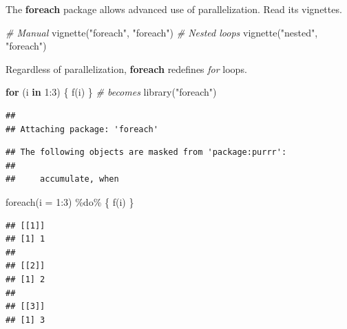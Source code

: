 \documentclass[
  12pt,
  american,
  a4paper,
  extrafontsizes,onecolumn,openright
  ]{memoir}
\newenvironment{Shaded}{\begin{snugshade}}{\end{snugshade}}
\newcommand{\AttributeTok}[1]{\textcolor[rgb]{0.77,0.63,0.00}{#1}}
\newcommand{\CommentTok}[1]{\textcolor[rgb]{0.56,0.35,0.01}{\textit{#1}}}
\newcommand{\ControlFlowTok}[1]{\textcolor[rgb]{0.13,0.29,0.53}{\textbf{#1}}}
\newcommand{\DecValTok}[1]{\textcolor[rgb]{0.00,0.00,0.81}{#1}}
\newcommand{\FunctionTok}[1]{\textcolor[rgb]{0.00,0.00,0.00}{#1}}
\newcommand{\NormalTok}[1]{#1}
\newcommand{\SpecialCharTok}[1]{\textcolor[rgb]{0.00,0.00,0.00}{#1}}
\newcommand{\StringTok}[1]{\textcolor[rgb]{0.31,0.60,0.02}{#1}}
\begin{document}
The \textbf{foreach} package allows advanced use of parallelization.
Read its vignettes.

\scriptsize

\begin{Shaded}
\begin{Highlighting}[]
\CommentTok{\# Manual}
\FunctionTok{vignette}\NormalTok{(}\StringTok{"foreach"}\NormalTok{, }\StringTok{"foreach"}\NormalTok{)}
\CommentTok{\# Nested loops}
\FunctionTok{vignette}\NormalTok{(}\StringTok{"nested"}\NormalTok{, }\StringTok{"foreach"}\NormalTok{)}
\end{Highlighting}
\end{Shaded}

\normalsize

Regardless of parallelization, \textbf{foreach} redefines \emph{for} loops.

\scriptsize

\begin{Shaded}
\begin{Highlighting}[]
\ControlFlowTok{for}\NormalTok{ (i }\ControlFlowTok{in} \DecValTok{1}\SpecialCharTok{:}\DecValTok{3}\NormalTok{) \{}
    \FunctionTok{f}\NormalTok{(i)}
\NormalTok{\}}
\CommentTok{\# becomes}
\FunctionTok{library}\NormalTok{(}\StringTok{"foreach"}\NormalTok{)}
\end{Highlighting}
\end{Shaded}

\begin{verbatim}
## 
## Attaching package: 'foreach'
\end{verbatim}

\begin{verbatim}
## The following objects are masked from 'package:purrr':
## 
##     accumulate, when
\end{verbatim}

\begin{Shaded}
\begin{Highlighting}[]
\FunctionTok{foreach}\NormalTok{(}\AttributeTok{i =} \DecValTok{1}\SpecialCharTok{:}\DecValTok{3}\NormalTok{) }\SpecialCharTok{\%do\%}\NormalTok{ \{}
    \FunctionTok{f}\NormalTok{(i)}
\NormalTok{\}}
\end{Highlighting}
\end{Shaded}

\begin{verbatim}
## [[1]]
## [1] 1
## 
## [[2]]
## [1] 2
## 
## [[3]]
## [1] 3
\end{verbatim}

\normalsize
\end{document}
